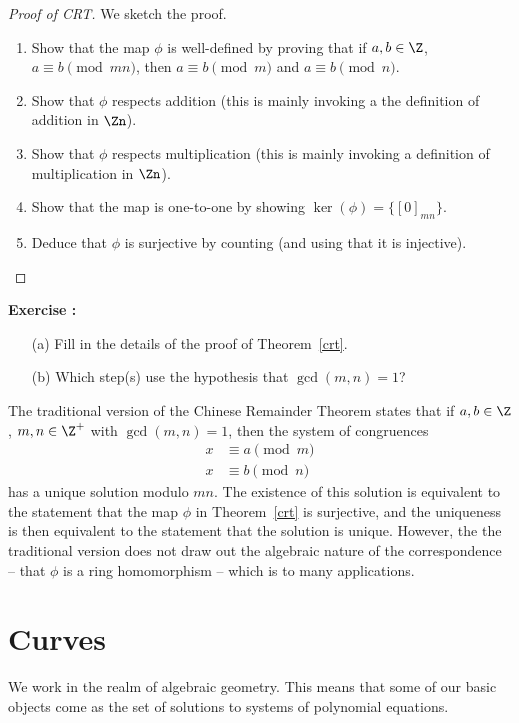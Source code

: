 \documentclass[12pt]{amsart}
\newcounter{probs}
\newenvironment{prob}{%
  \refstepcounter{probs}
  \par\medskip\noindent\textbf{Exercise \theprobs:} }{\par\medskip}
\theoremstyle{plain}
\theoremstyle{definition}
\theoremstyle{remark}
\begin{document}
\begin{proof}[Proof of CRT]
  We sketch the proof.
  \begin{enumerate}
  \item Show that the map $\phi$ is well-defined by proving that if $a,b\in\Z$,
    $a\equiv b\pmod{mn}$, then $a\equiv b\pmod m$ and $a\equiv b\pmod
    n$.
  \item Show that $\phi$ respects addition (this is mainly invoking a 
    the definition of addition in $\Zn$).
  \item Show that $\phi$ respects multiplication (this is mainly invoking a 
    definition of multiplication in $\Zn$).
  \item Show that the map is one-to-one by showing $\ker(\phi) =
    \{[0]_{mn}\}$.
  \item Deduce that $\phi$ is surjective by counting (and using that
    it is injective).
  \end{enumerate}
\end{proof}
\begin{prob}
  \begin{enumerate}
  \item[(a)]  Fill in the details of the proof of Theorem~\ref{crt}.  
  \item[(b)] Which  step(s) use the hypothesis that $\gcd(m,n)=1$?
  \end{enumerate}
\end{prob}
The traditional version of the Chinese Remainder Theorem states that
if $a,b\in\Z$, $m,n\in\Z^+$ with $\gcd(m,n)=1$, then the system of
congruences 
\begin{align*}
x&\equiv a \pmod m \\
x &\equiv b\pmod n
\end{align*} 
has a unique solution modulo $mn$.  The existence of this solution is
equivalent to the statement that the map $\phi$ in Theorem~\ref{crt}
is surjective, and the uniqueness is then equivalent to the statement
that the solution is unique.  However, the the traditional version
does not draw out the algebraic nature of the correspondence -- that
$\phi$ is a ring homomorphism -- which is to many applications.






\section{Curves}
We work in the realm of algebraic geometry.  This means that some of
our basic objects come as the set of solutions to systems of
polynomial equations.
\end{document}
